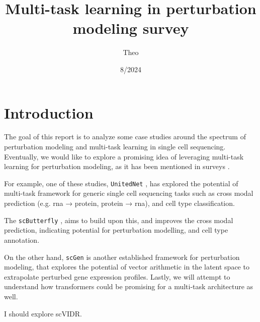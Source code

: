 \documentclass[12pt, a4paper]{article}
\begin{document}
\title{\vspace{-1cm}
Multi-task learning in perturbation modeling survey}

\author{Theo}


\date{8/2024}


\sloppy
\maketitle

{
\hypersetup{linkcolor=black}
\tableofcontents
}

\clearpage

\section{Introduction}

The goal of this report is to analyze some case studies around the spectrum of perturbation modeling and multi-task learning in single cell sequencing. Eventually, we would like to explore a promising idea of leveraging multi-task learning for perturbation modeling, as it has been mentioned in surveys \cite{jiMachineLearningPerturbational2021}.

For example, one of these studies, \verb|UnitedNet| \cite{tangExplainableMultitaskLearning2023}, has explored the potential of multi-task framework for generic single cell sequencing tasks such as cross modal prediction (e.g. rna → protein, protein → rna), and cell type classification.

The \verb|scButterfly| \cite{caoScButterflyVersatileSinglecell2024}, aims to build upon this, and improves the cross modal prediction, indicating potential for perturbation modelling, and cell type annotation.

On the other hand, \verb|scGen| \cite{lotfollahiScGenPredictsSinglecell2019} is another established framework for perturbation modeling, that explores the potential of vector arithmetic in the latent space to extrapolate perturbed gene expression profiles. Lastly, we will attempt to understand how transformers could be promising for a multi-task architecture as well.

I should explore scVIDR.
\end{document}
